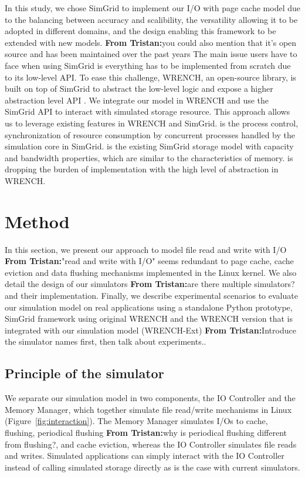 \documentclass[conference]{IEEEtran}
\newcommand{\tristan}[1]{\color{orange}\textbf{From Tristan:}#1\color{black}}
\newcommand{\english}[1]{\uwave{#1}}
\begin{document}
			In this study, we chose SimGrid to implement our I/O with page cache model
			due to the balancing between accuracy and scalibility, the versatility allowing it 
			to be adopted in different domains, and the design enabling this 
			framework to be extended with new models. \tristan{you could also mention that it's open source and has been maintained over the past years}
			The main issue users have to face when using SimGrid is everything has to be 
			implemented from scratch due to its low-level API. 
			To ease this challenge, WRENCH, an open-source library, is built on top 
			of SimGrid to abstract the low-level logic and expose a higher abstraction 
			level API \cite{casanova2018wrench}. 
			We integrate our model in WRENCH and use the SimGrid API to interact with 
			simulated storage resource.
			This approach allows us to leverage existing features in WRENCH and SimGrid.
			\english{The first} is the process control, synchronization of resource consumption by 
			concurrent processes handled by the simulation core in SimGrid. 
			\english{The second} is the existing SimGrid storage model with capacity and 
			bandwidth properties, which are similar to the characteristics of memory.
			\english{The third} is dropping the burden of implementation with the high level 
			of abstraction in WRENCH. 
			
	\section{Method}
	\label{method}	

		In this section, we present our approach to model file read and write with
		I/O \tristan{"read and write with I/O" seems redundant} to page cache, cache eviction and data flushing mechanisms implemented 
		in the Linux kernel. We also detail the design of our simulators \tristan{are there multiple simulators?} and their
		implementation. Finally, we describe experimental scenarios to evaluate
		our simulation model on real applications using a standalone Python
		prototype, SimGrid framework using original WRENCH and the WRENCH version 
		that is integrated with our simulation model (WRENCH-Ext) \tristan{Introduce the simulator names first, then talk about experiments.}.

		\subsection{Principle of the simulator}
	
            We separate our simulation model in two components, the IO
			Controller and the Memory Manager, which together simulate 
			file read/write mechanisms in Linux (Figure~\ref{fig:interaction}). 
			The Memory Manager simulates I/Os to cache, flushing, periodical flushing \tristan{why is periodical flushing different from flushing?}, 
			and cache eviction, whereas the IO Controller simulates file reads and writes. 
			Simulated applications can simply interact with the IO Controller instead of 
			calling simulated storage directly as is the case with current simulators.
\end{document}
